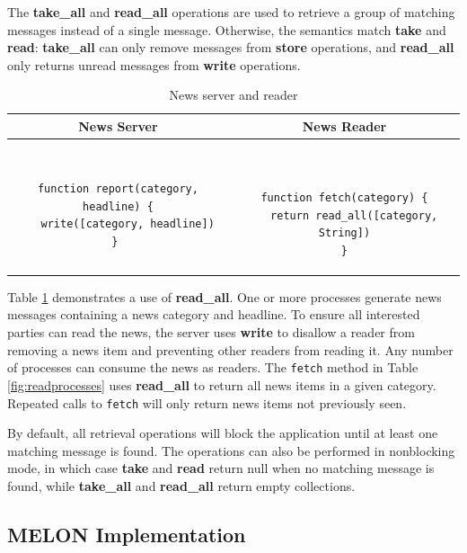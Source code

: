 \documentclass{llncs}
\begin{document}
The \textbf{take\_all} and \textbf{read\_all} operations are used to retrieve a group of matching messages instead of a single message. Otherwise, the semantics match \textbf{take} and \textbf{read}: \textbf{take\_all} can only remove messages from \textbf{store} operations, and \textbf{read\_all} only returns unread messages from \textbf{write} operations.

\begin{table}
\centering
\caption{News server and reader}
\begin{tabular}{|c|c|} \hline
\textbf{News Server} & \textbf{News Reader} \\ \hline
\begin{minipage}{2.45in}
\begin{verbatim}

function report(category, headline) {
   write([category, headline])
} 
\end{verbatim}
\end{minipage}
&
\begin{minipage}{2.5in}
\begin{verbatim}


function fetch(category) {
   return read_all([category, String])
}
\end{verbatim}
\end{minipage}
\\ \hline
\end{tabular}
\label{fig:newsreader}
\end{table}

Table \ref{fig:newsreader} demonstrates a use of \textbf{read\_all}. One or more processes generate news messages containing a news category and headline. To ensure all interested parties can read the news, the server uses \textbf{write} to disallow a reader from removing a news item and preventing other readers from reading it. Any number of processes can consume the news as readers. The \texttt{fetch} method in Table \ref{fig:readprocesses} uses \textbf{read\_all} to return all news items in a given category. Repeated calls to \texttt{fetch} will only return news items not previously seen.

By default, all retrieval operations will block the application until at least one matching message is found. The operations can also be performed in nonblocking mode, in which case \textbf{take} and \textbf{read} return null when no matching message is found, while \textbf{take\_all} and \textbf{read\_all} return empty collections.
   
\subsection{MELON Implementation}\label{sec:implementation}
\end{document}

